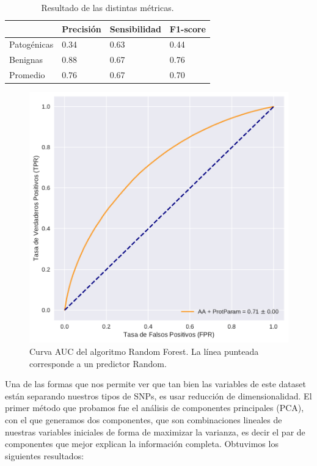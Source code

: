 \begin{table}[H]
\centering
\begin{tabular}{|l|l|l|l|}
\hline
              & Precisión & Sensibilidad & F1-score \\ \hline
Patogénicas   & 0.34      & 0.63   & 0.44     \\ \hline
Benignas      & 0.88      & 0.67   & 0.76     \\ \hline
Promedio      & 0.76      & 0.67   & 0.70     \\ \hline
\end{tabular}
\caption{Resultado de las distintas métricas.}
\label{my-label}
\end{table}


\begin{figure}[h]
    \centering
    \includegraphics[scale=0.73]{documents/latex/figures/3/auc_1.pdf}
    \caption{Curva AUC del algoritmo Random Forest. La línea punteada corresponde a un predictor Random.}
    \label{fig:auc_1}
\end{figure}

Una de las formas que nos permite ver que tan bien las variables de este dataset están separando nuestros tipos de SNPs, es usar reducción de dimensionalidad. El primer método que probamos fue el análisis de componentes principales (PCA), con el que generamos dos componentes, que son combinaciones lineales de nuestras variables iniciales de forma de maximizar la varianza, es decir el par de componentes que mejor explican la información completa. Obtuvimos los siguientes resultados:

